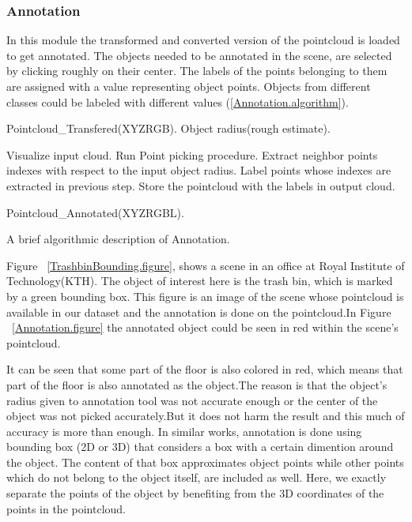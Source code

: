  
 
\subsubsection{Annotation}
\label{Annotation.ssec}
In this module the transformed and converted version of the pointcloud is loaded to get annotated. 
The objects needed to be annotated in the scene, are selected by clicking roughly on their center. 
The labels of the points belonging to them are assigned with a value representing object points. 
Objects from different classes could be labeled with different values (\ref{Annotation.algorithm}).

\begin{algorithm}[t]
\begin{algorithmic}[1]
\REQUIRE Pointcloud\_Transfered(XYZRGB).
\REQUIRE Object radius(rough estimate).
\medskip

\STATE Visualize input cloud.
  \STATE Run Point picking procedure.
  \STATE Extract neighbor points indexes with respect to the input object radius.
  \STATE Label points whose indexes are extracted in previous step.
\ENDFOR
\STATE Store the pointcloud with the labels in output cloud.

\medskip
\ENSURE Pointcloud\_Annotated(XYZRGBL).
\end{algorithmic}
\caption[Annotation.]
{A brief algorithmic description of Annotation.}
\label{Annotation.algorithm}
\end{algorithm}


Figure ~\ref{TrashbinBounding.figure}, shows a scene in an office at Royal Institute of Technology(KTH). 
The object of interest here is the trash bin, which is marked by a green bounding box. 
This figure is an image of the scene whose pointcloud is available in our dataset and the annotation is done on 
the pointcloud.In Figure ~\ref{Annotation.figure} the annotated object could be seen in red within the scene's pointcloud.


It can be seen that some part of the floor is also colored in red, which means that part of the floor is also 
annotated as the object.The reason is that the object's radius given to annotation tool was not accurate enough or the center of the 
object was not picked accurately.But it does not harm the result and this much of accuracy is more than enough.
In similar works, annotation is done using bounding box (2D or 3D) that considers a box with a certain dimention around the object. The content of that box approximates object points while other points which do not belong to the object itself, are included as well.
Here, we exactly separate the points of the object by benefiting from the 3D coordinates of the points in the 
pointcloud.


